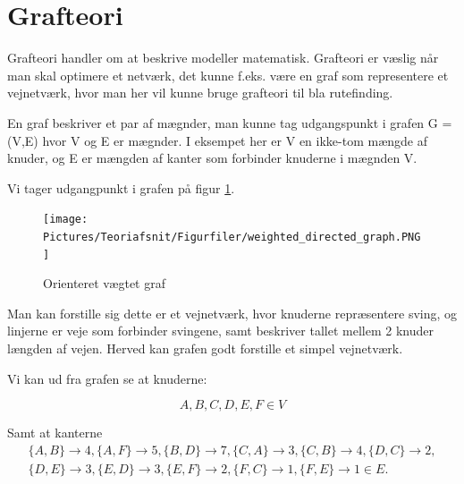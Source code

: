 \section{Grafteori}

Grafteori handler om at beskrive  modeller matematisk. Grafteori er væslig når man skal optimere et netværk, det kunne f.eks. være en graf som representere et vejnetværk, hvor man her vil kunne bruge grafteori til bla rutefinding.  

En graf beskriver et par af mægnder, man kunne tag udgangspunkt i grafen G = (V,E) hvor V og E er mægnder. I eksempet her er V en ikke-tom mængde af knuder, og E er mængden af kanter som forbinder knuderne i mægnden V. 

\vspace{5mm}

Vi tager udgangpunkt i grafen på figur \ref{fig:weighted-directed-graph}.

\begin{figure}[H]
\begin{adjustbox}{width=0.5\textwidth,center=\textwidth}
\centering
\texttt{[image: Pictures/Teoriafsnit/Figurfiler/weighted\_directed\_graph.PNG]}
\end{adjustbox}
\caption{Orienteret vægtet graf}
\label{fig:weighted-directed-graph}
\end{figure}

\vspace{5mm}

Man kan forstille sig dette er et vejnetværk, hvor knuderne repræsentere sving, og linjerne er veje som forbinder svingene, samt beskriver tallet mellem 2 knuder længden af vejen. Herved kan grafen godt forstille et simpel vejnetværk.

\vspace{5mm}

Vi kan ud fra grafen se at knuderne:

\begin{equation}
A, B, C, D, E, F \in V
\end{equation}

Samt at kanterne
\begin{equation}\label{grafteori}
\begin{split}
\{A,B\} \rightarrow 4, \{A,F\} \rightarrow 5, \{B,D\} \rightarrow 7, \{C,A\} \rightarrow 3, \{C,B\} \rightarrow 4, \{D,C\} \rightarrow 2, \\ 
\{D,E\} \rightarrow 3, \{E,D\} \rightarrow 3, \{E,F\} \rightarrow 2, \{F,C\} \rightarrow 1, \{F,E\} \rightarrow 1 \in E.
\end{split}
\end{equation}

